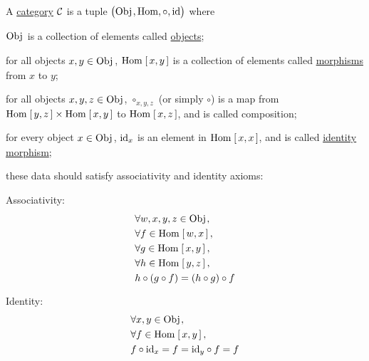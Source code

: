 \begin{definition}
	A \ul{category} $\Cc$ is a tuple $\prths{\Obj, \Hom, \circ, \id}$ where
	\begin{enumarab}
		\item
		$\Obj$ is a collection of elements called \ul{objects};
		\item
		for all objects $x, y \in \Obj$, $\Homset{x}{y}$ is a collection of elements
		called \ul{morphisms} from $x$ to $y$;
		\item
		for all objects $x, y, z \in \Obj$, $\circ_{x,y,z}$ (or simply $\circ$) is a
		map from $\Homset{y}{z} \times \Homset{x}{y}$ to $\Homset{x}{z}$, and is called
		composition;
		\item
		for every object $x \in \Obj$, $\id_x$ is an element in $\Homset{x}{x}$, and is
		called \ul{identity morphism};
		\item
		these data should satisfy associativity and identity axioms:
		\begin{enumalpha}
			\begin{minipage}[t]{0.4\textwidth}
				\item
				Associativity:
				\begin{align*}
					 & \forall                   w, x, y, z \in \Obj,         \\
					 & \forall                   f \in \Homset{w}{x},         \\
					 & \forall                   g \in \Homset{x}{y},         \\
					 & \forall                   h \in \Homset{y}{z},         \\
					 & h \circ \prths{g \circ f}  = \prths{h \circ g} \circ f \\
				\end{align*}
			\end{minipage}
			\begin{minipage}[t]{0.4\textwidth}
				\item
				Identity:
				\begin{align*}
					 & \forall x, y \in \Obj,                \\
					 & \forall f \in \Homset{x}{y},          \\
					 & f \circ \id_x = f = \id_y \circ f = f
				\end{align*}
			\end{minipage}
		\end{enumalpha}
	\end{enumarab}
\end{definition}

